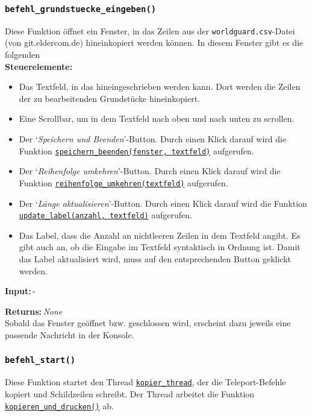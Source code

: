 \documentclass{article}
\newcommand{\initem}[2]{\item[\hspace{0.5em} {\normalfont\ttfamily{#1}} {\normalfont\itshape{(#2)}}]}
\newcommand{\bfpara}[1]{\noindent \textbf{#1:}\,}
\begin{document}
\subsubsection*{\texttt{befehl\_grundstuecke\_eingeben()}}
Diese Funktion \"offnet ein Fenster, in das Zeilen aus der \texttt{worldguard.csv}-Datei (von git.eldercom.de) hineinkopiert werden k\"onnen. In diesem Fenster gibt es die folgenden\\

\bfpara{Steuerelemente}
\begin{itemize}
	\initem{textfeld}{Text} Das Textfeld, in das hineingeschrieben werden kann. Dort werden die Zeilen der zu bearbeitenden Grundst\"ucke hineinkopiert.
	\initem{scrollbar}{Scrollbar} Eine Scrollbar, um in dem Textfeld nach oben und nach unten zu scrollen.
	\initem{speichern}{Button} Der `\textit{Speichern und Beenden}'-Button. Durch einen Klick darauf wird die Funktion \hyperref[subsubsec:speichern_beenden]{\texttt{speichern\_beenden(fenster, textfeld)}} aufgerufen.
	\initem{umkehren}{Button} Der `\textit{Reihenfolge umkehren}'-Button. Durch einen Klick darauf wird die Funktion \hyperref[subsubsec:reihenfolge_umkehren]{\texttt{reihenfolge\_umkehren(textfeld)}} aufgerufen.
	\initem{updaten}{Button} Der `\textit{L\"ange aktualisieren}'-Button. Durch einen Klick darauf wird die Funktion \hyperref[subsubsec:update_label]{\texttt{update\_label(anzahl, textfeld)}} aufgerufen.
	\initem{anzahl}{Label} Das Label, dass die Anzahl an nichtleeren Zeilen in dem Textfeld angibt. Es gibt auch an, ob die Eingabe im Textfeld syntaktisch in Ordnung ist. Damit das Label aktualisiert wird, muss auf den entsprechenden Button geklickt werden.\\
\end{itemize}

\bfpara{Input}-

\bfpara{Returns}\textit{None}\\

Sobald das Fenster ge\"offnet bzw. geschlossen wird, erscheint dazu jeweils eine passende Nachricht in der Konsole.\\[11pt]

\subsubsection*{\texttt{befehl\_start()}}
Diese Funktion startet den Thread \hyperref[subsec:globale_variablen]{\texttt{kopier\_thread}}, der die Teleport-Befehle kopiert und Schildzeilen schreibt. Der Thread arbeitet die Funktion \hyperref[subsubsec:kopieren_und_drucken]{\texttt{kopieren\_und\_drucken()}} ab.\\
\end{document}
